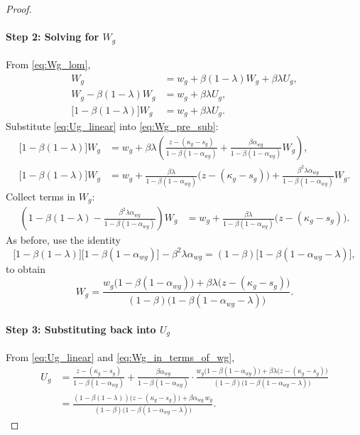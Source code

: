 \documentclass[preprint,12pt]{elsarticle}
\begin{document}
\begin{proof}
\paragraph{Step 2: Solving for \(W_g\)}
From \eqref{eq:Wg_lom},
\begin{align}
W_g &= w_g + \beta(1-\lambda)W_g + \beta\lambda U_g,\\
W_g - \beta(1-\lambda)W_g &= w_g + \beta\lambda U_g,\\
\big[1-\beta(1-\lambda)\big]W_g &= w_g + \beta\lambda U_g. \label{eq:Wg_pre_sub}
\end{align}
Substitute \eqref{eq:Ug_linear} into \eqref{eq:Wg_pre_sub}:
\begin{align}
\big[1-\beta(1-\lambda)\big]W_g
&= w_g + \beta\lambda\left(
\frac{z-(\kappa_g-s_g)}{1-\beta(1-\alpha_{wg})}
+ \frac{\beta\alpha_{wg}}{1-\beta(1-\alpha_{wg})}W_g
\right),\\
\big[1-\beta(1-\lambda)\big]W_g
&= w_g + \frac{\beta\lambda}{1-\beta(1-\alpha_{wg})}\big(z-(\kappa_g-s_g)\big)
+ \frac{\beta^2\lambda\alpha_{wg}}{1-\beta(1-\alpha_{wg})}W_g.
\end{align}
Collect terms in \(W_g\):
\begin{align}
\left(
1-\beta(1-\lambda) - \frac{\beta^2\lambda\alpha_{wg}}{1-\beta(1-\alpha_{wg})}
\right)W_g
&= w_g + \frac{\beta\lambda}{1-\beta(1-\alpha_{wg})}\big(z-(\kappa_g-s_g)\big).
\end{align}
As before, use the identity
\[
\big[1-\beta(1-\lambda)\big]\big[1-\beta(1-\alpha_{wg})\big]-\beta^2\lambda\alpha_{wg}
= (1-\beta)\big[1-\beta(1-\alpha_{wg}-\lambda)\big],
\]
to obtain
\begin{equation}
W_g
= \frac{w_g\big(1-\beta(1-\alpha_{wg})\big) + \beta\lambda\big(z-(\kappa_g-s_g)\big)}
{(1-\beta)\big(1-\beta(1-\alpha_{wg}-\lambda)\big)}.
\label{eq:Wg_in_terms_of_wg}
\end{equation}

\paragraph{Step 3: Substituting back into \(U_g\)}
From \eqref{eq:Ug_linear} and \eqref{eq:Wg_in_terms_of_wg},
\begin{align}
U_g
&= \frac{z-(\kappa_g-s_g)}{1-\beta(1-\alpha_{wg})}
+ \frac{\beta\alpha_{wg}}{1-\beta(1-\alpha_{wg})}
\cdot
\frac{w_g\big(1-\beta(1-\alpha_{wg})\big) + \beta\lambda\big(z-(\kappa_g-s_g)\big)}
{(1-\beta)\big(1-\beta(1-\alpha_{wg}-\lambda)\big)}\\
&= \frac{(1-\beta(1-\lambda))\big(z-(\kappa_g-s_g)\big) + \beta\alpha_{wg}\,w_g}
{(1-\beta)\big(1-\beta(1-\alpha_{wg}-\lambda)\big)}.
\label{eq:Ug_in_terms_of_wg}
\end{align}


\end{proof}
\end{document}
